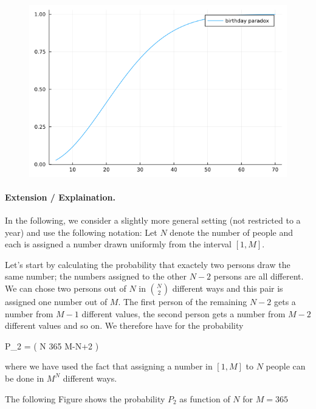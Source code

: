 \begin{figure}[H]
    \centering
    \includegraphics[scale=0.5]{images/2022-12-15-birthday_00.png}
\end{figure}


\paragraph{Extension / Explaination.} In the following, we consider a slightly more general setting (not restricted to a year) and use the following notation: Let $N$ denote the number of people and each is assigned a number drawn uniformly from the interval $[1,M]$.

Let's start by calculating the probability that exactely two persons draw the same number; the numbers assigned to the other $N-2$ persons are all different. We can chose two persons out of $N$ in ${N \choose 2}$ different ways and this pair is assigned one number out of $M$. The first person of the remaining $N-2$ gets a number from $M-1$ different values, the second person gets a number from $M-2$ different values and so on. We therefore have for the probability

\bee
P_2 = \left( {N } 365   \times \cdots \times M-N+2 \right) 
\eee

where we have used the fact that assigning a number in $[1,M]$ to $N$ people can be done in $M^N$ different ways.

The following Figure shows the probability $P_2$ as function of $N$ for $M=365$

